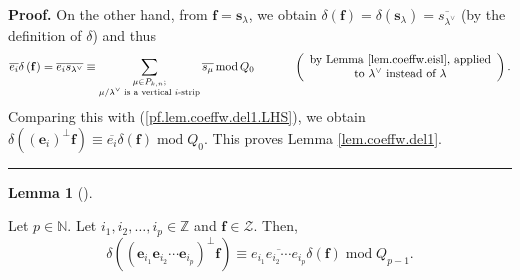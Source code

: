 \documentclass[numbers=enddot,12pt,final,onecolumn,notitlepage]{scrartcl}%
\theoremstyle{definition}
\newtheorem{lem}[theo]{Lemma}
\newenvironment{lemma}[1][]
{\begin{lem}[#1]\begin{leftbar}}
{\end{leftbar}\end{lem}}
\newenvironment{proof}[1][Proof]{\noindent\textbf{#1.} }{\ \rule{0.5em}{0.5em}}
\let\sumnonlimits\sum
\renewcommand{\sum}{\sumnonlimits\limits}
\begin{document}
\begin{proof}
On the other hand, from $\mathbf{f}=\mathbf{s}_{\lambda}$, we obtain
$\delta\left(  \mathbf{f}\right)  =\delta\left(  \mathbf{s}_{\lambda}\right)
=\overline{s_{\lambda^{\vee}}}$ (by the definition of $\delta$) and thus%
\[
\overline{e_{i}}\delta\left(  \mathbf{f}\right)  =\overline{e_{i}}%
\overline{s_{\lambda^{\vee}}}\equiv\sum_{\substack{\mu\in P_{k,n}%
;\\\mu/\lambda^{\vee}\text{ is a vertical }i\text{-strip}}}\overline{s_{\mu}%
}\operatorname{mod}Q_{0}\ \ \ \ \ \ \ \ \ \ \left(
\begin{array}
[c]{c}%
\text{by Lemma \ref{lem.coeffw.eisl}, applied}\\
\text{to }\lambda^{\vee}\text{ instead of }\lambda
\end{array}
\right)  .
\]
Comparing this with (\ref{pf.lem.coeffw.del1.LHS}), we obtain $\delta\left(
\left(  \mathbf{e}_{i}\right)  ^{\perp}\mathbf{f}\right)  \equiv
\overline{e_{i}}\delta\left(  \mathbf{f}\right)  \operatorname{mod}Q_{0}$.
This proves Lemma \ref{lem.coeffw.del1}.
\end{proof}

\begin{lemma}
\label{lem.coeffw.del2}Let $p\in\mathbb{N}$. Let $i_{1},i_{2},\ldots,i_{p}%
\in\mathbb{Z}$ and $\mathbf{f}\in\mathcal{Z}$. Then,%
\[
\delta\left(  \left(  \mathbf{e}_{i_{1}}\mathbf{e}_{i_{2}}\cdots
\mathbf{e}_{i_{p}}\right)  ^{\perp}\mathbf{f}\right)  \equiv\overline
{e_{i_{1}}e_{i_{2}}\cdots e_{i_{p}}}\delta\left(  \mathbf{f}\right)
\operatorname{mod}Q_{p-1}.
\]

\end{lemma}
\end{document}
